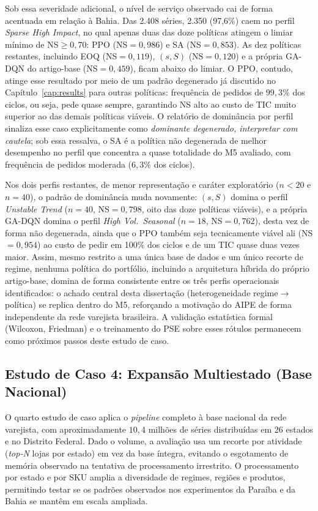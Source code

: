 Sob essa severidade adicional, o nível de serviço observado cai de forma acentuada em relação à Bahia. Das 2.408 séries, 2.350 (97,6\%) caem no perfil \textit{Sparse High Impact}, no qual apenas duas das doze políticas atingem o limiar mínimo de NS$\geq 0{,}70$: PPO (NS$=0{,}986$) e SA (NS$=0{,}853$). As dez políticas restantes, incluindo EOQ (NS$=0{,}119$), $(s,S)$ (NS$=0{,}120$) e a própria GA-DQN do artigo-base (NS$=0{,}459$), ficam abaixo do limiar. O PPO, contudo, atinge esse resultado por meio de um padrão degenerado já discutido no Capítulo~\ref{cap:results} para outras políticas: frequência de pedidos de $99{,}3\%$ dos ciclos, ou seja, pede quase sempre, garantindo NS alto ao custo de TIC muito superior ao das demais políticas viáveis. O relatório de dominância por perfil sinaliza esse caso explicitamente como \textit{dominante degenerado, interpretar com cautela}; sob essa ressalva, o SA é a política não degenerada de melhor desempenho no perfil que concentra a quase totalidade do M5 avaliado, com frequência de pedidos moderada ($6{,}3\%$ dos ciclos).

Nos dois perfis restantes, de menor representação e caráter exploratório ($n<20$ e $n=40$), o padrão de dominância muda novamente: $(s,S)$ domina o perfil \textit{Unstable Trend} ($n=40$, NS$=0{,}798$, oito das doze políticas viáveis), e a própria GA-DQN domina o perfil \textit{High Vol.~Seasonal} ($n=18$, NS$=0{,}762$), desta vez de forma não degenerada, ainda que o PPO também seja tecnicamente viável ali (NS$=0{,}954$) ao custo de pedir em 100\% dos ciclos e de um TIC quase duas vezes maior. Assim, mesmo restrito a uma única base de dados e um único recorte de regime, nenhuma política do portfólio, incluindo a arquitetura híbrida do próprio artigo-base, domina de forma consistente entre os três perfis operacionais identificados: o achado central desta dissertação (heterogeneidade regime$\rightarrow$política) se replica dentro do M5, reforçando a motivação do AIPE de forma independente da rede varejista brasileira. A validação estatística formal (Wilcoxon, Friedman) e o treinamento do PSE sobre esses rótulos permanecem como próximos passos deste estudo de caso.

\subsection{Estudo de Caso 4: Expansão Multiestado (Base Nacional)}

O quarto estudo de caso aplica o \textit{pipeline} completo à base nacional da rede varejista, com aproximadamente $10{,}4$ milhões de séries distribuídas em 26 estados e no Distrito Federal. Dado o volume, a avaliação usa um recorte por atividade (\textit{top-N} lojas por estado) em vez da base íntegra, evitando o esgotamento de memória observado na tentativa de processamento irrestrito. O processamento por estado e por SKU amplia a diversidade de regimes, regiões e produtos, permitindo testar se os padrões observados nos experimentos da Paraíba e da Bahia se mantêm em escala ampliada.

